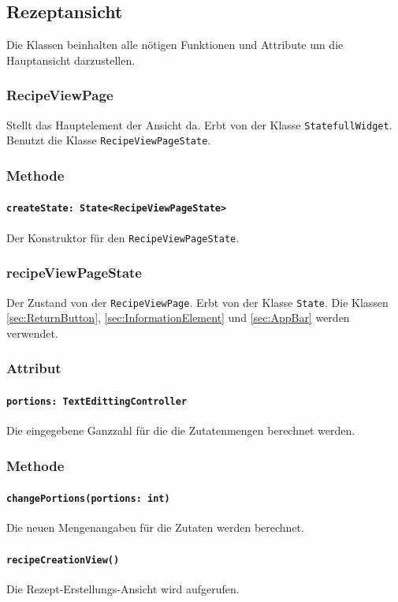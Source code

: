 \documentclass{entwurfsheft}
\begin{document}
\subsection{Rezeptansicht}
    Die Klassen beinhalten alle nötigen Funktionen und Attribute um die Hauptansicht darzustellen.

    \subsubsection{RecipeViewPage}
    Stellt das Hauptelement der Ansicht da. Erbt von der Klasse \texttt{StatefullWidget}. Benutzt die Klasse \texttt{RecipeViewPageState}.
        \subsubsection*{Methode}
            \paragraph*{\texttt{createState: State<RecipeViewPageState>}} Der Konstruktor für den \texttt{RecipeViewPageState}.
        
    \subsubsection{recipeViewPageState}
    Der Zustand von der \texttt{RecipeViewPage}. Erbt von der Klasse \texttt{State}. Die Klassen \ref{sec:ReturnButton}, \ref{sec:InformationElement} und \ref{sec:AppBar} werden verwendet.
        \subsubsection*{Attribut}
            \paragraph*{\texttt{portions: TextEdittingController}} Die eingegebene Ganzzahl für die die Zutatenmengen berechnet werden.
    
        \subsubsection*{Methode}
            \paragraph*{\texttt{changePortions(portions: int)}} Die neuen Mengenangaben für die Zutaten werden berechnet.
            \paragraph*{\texttt{recipeCreationView()}} Die Rezept-Erstellungs-Ansicht wird aufgerufen.
\end{document}
